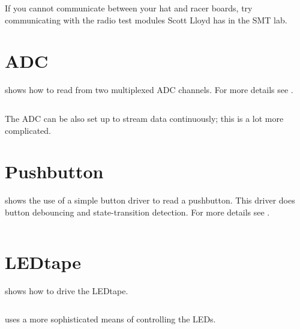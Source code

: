 If you cannot communicate between your hat and racer boards, try
communicating with the radio test modules Scott Lloyd has in the SMT
lab.


\section{ADC}
\label{ADC}

 shows
how to read from two multiplexed ADC channels.  For more details
see .

\inputminted{C}{../../src/test-apps/adc_usb_serial_test2/adc_usb_serial_test2.c}

The ADC can be also set up to stream data continuously; this is a lot
more complicated.


\section{Pushbutton}
\label{pushbutton}

 shows the use of a
simple button driver to read a pushbutton.  This driver does button
debouncing and state-transition detection.  For more details see
.

\inputminted{C}{../../src/test-apps/button_test2/button_test2.c}


\section{LEDtape}
\label{ledtape}

 shows how to drive the
LEDtape.

\inputminted{C}{../../src/test-apps/ledtape_test1/ledtape_test1.c}


 uses a more
sophisticated means of controlling the LEDs.

\inputminted{C}{../../src/test-apps/ledtape_test2/ledtape_test2.c}

